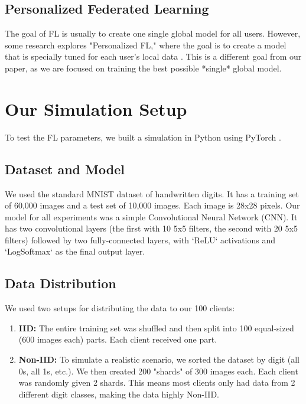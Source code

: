 \documentclass[conference]{IEEEtran}
\begin{document}
\subsection{Personalized Federated Learning}
The goal of FL is usually to create one single global model for all users. However, some research explores "Personalized FL," where the goal is to create a model that is specially tuned for each user's local data \cite{b13, b14, b15}. This is a different goal from our paper, as we are focused on training the best possible *single* global model.


\section{Our Simulation Setup}
To test the FL parameters, we built a simulation in Python using PyTorch \cite{b16}.

\subsection{Dataset and Model}
We used the standard MNIST dataset of handwritten digits. It has a training set of 60,000 images and a test set of 10,000 images. Each image is 28x28 pixels.
Our model for all experiments was a simple Convolutional Neural Network (CNN). It has two convolutional layers (the first with 10 5x5 filters, the second with 20 5x5 filters) followed by two fully-connected layers, with `ReLU` activations and `LogSoftmax` as the final output layer.

\subsection{Data Distribution}
We used two setups for distributing the data to our 100 clients:
\begin{enumerate}
    \item \textbf{IID:} The entire training set was shuffled and then split into 100 equal-sized (600 images each) parts. Each client received one part.
    \item \textbf{Non-IID:} To simulate a realistic scenario, we sorted the dataset by digit (all 0s, all 1s, etc.). We then created 200 "shards" of 300 images each. Each client was randomly given 2 shards. This means most clients only had data from 2 different digit classes, making the data highly Non-IID.
\end{enumerate}
\end{document}
